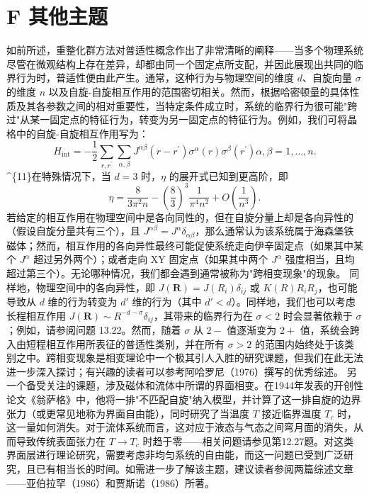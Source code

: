 \section{F 其他主题}\label{f-ux5176ux4ed6ux4e3bux9898}
如前所述，重整化群方法对普适性概念作出了非常清晰的阐释——当多个物理系统尽管在微观结构上存在差异，却都由同一个固定点所支配，并因此展现出共同的临界行为时，普适性便由此产生。通常，这种行为与物理空间的维度 \(d\)、自旋向量 \(\sigma\) 的维度 \(n\) 以及自旋-自旋相互作用的范围密切相关。然而，根据哈密顿量的具体性质及其各参数之间的相对重要性，当特定条件成立时，系统的临界行为很可能"跨过"从某一固定点的特征行为，转变为另一固定点的特征行为。例如，我们可将晶格中的自旋-自旋相互作用写为：
\begin{equation}\tag{14.4.49}\label{eq:14.4.49}
H _ { \mathrm { i n t } } = - \frac { 1 } { 2 } \sum _ { r , r ^{\prime} } \sum _ { \alpha , \beta } J ^{\alpha \beta} ( r - r ^{\prime} ) \sigma ^{\alpha} ( r ) \sigma ^{\beta} ( r ^{\prime} )  \alpha , \beta = 1 , \ldots , n .
\end{equation}
\^{}\{11\}在特殊情况下，当 \(d=3\) 时，\(\eta\) 的展开式已知到更高阶，即
\begin{equation}\tag{14.4.50}\label{eq:14.4.50}
\eta = \frac { 8 } { 3 \pi ^{2} n } - \left( \frac { 8 } { 3 } \right) ^{3} \frac { 1 } { \pi ^{4} n ^{2} } + O \left( \frac { 1 } { n ^{3} } \right) .
\end{equation}
若给定的相互作用在物理空间中是各向同性的，但在自旋分量上却是各向异性的（假设自旋分量共有三个），且 \(J^{\alpha\beta}=J^{\alpha}\delta_{\alpha\beta}\)，那么通常认为该系统属于海森堡铁磁体；然而，相互作用的各向异性最终可能促使系统走向伊辛固定点（如果其中某个 \(J^{\alpha}\) 超过另外两个）；或者走向 XY 固定点（如果其中两个 \(J^{\alpha}\) 强度相当，且均超过第三个）。无论哪种情况，我们都会遇到通常被称为"跨相变现象"的现象。
同样地，物理空间中的各向异性，即 \(J(\boldsymbol{R})=J(R_{i})\delta_{ij}\) 或 \(K(R)R_{i}R_{j}\)，也可能导致从 \(d\) 维的行为转变为 \(d'\) 维的行为（其中 \(d'<d\)）。同样地，我们也可以考虑长程相互作用 \(J(\boldsymbol{R})\sim R^{-d-\sigma}\delta_{ij}\)，其带来的临界行为在 \(\sigma<2\) 时会显著依赖于 \(\sigma\)；例如，请参阅问题 13.22。然而，随着 \(\sigma\) 从 \(2-\) 值逐渐变为 \(2+\) 值，系统会跨入由短程相互作用所表征的普适性类别，并在所有 \(\sigma>2\) 的范围内始终处于该类别之中。跨相变现象是相变理论中一个极其引人入胜的研究课题，但我们在此无法进一步深入探讨；有兴趣的读者可以参考阿哈罗尼（1976）撰写的优秀综述。
另一个备受关注的课题，涉及磁体和流体中所谓的界面相变。在1944年发表的开创性论文《翁萨格》中，他将一排"不匹配自旋"纳入模型，并计算了这一排自旋的边界张力（或更常见地称为界面自由能），同时研究了当温度 \(T\) 接近临界温度 \(T_c\) 时，这一量如何消失。对于流体系统而言，这对应于液态与气态之间弯月面的消失，从而导致传统表面张力在 \(T \to T_c\) 时趋于零——相关问题请参见第12.27题。对这类界面层进行理论研究，需要考虑非均匀系统的自由能，而这一问题已受到广泛研究，且已有相当长的时间。如需进一步了解该主题，建议读者参阅两篇综述文章——亚伯拉罕（1986）和贾斯诺（1986）所著。
